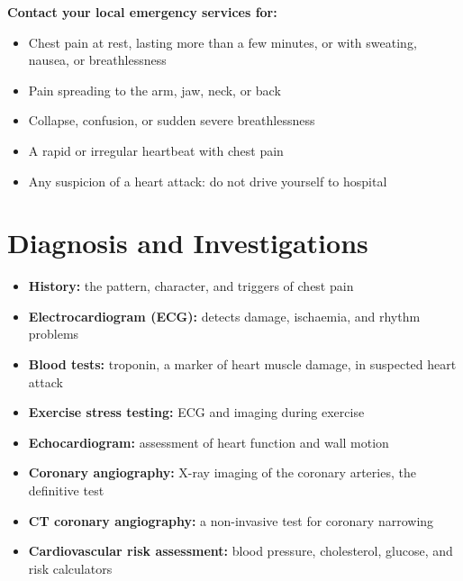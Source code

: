 \textbf{Contact your local emergency services for:}
\begin{itemize}
    \item Chest pain at rest, lasting more than a few minutes, or with sweating, nausea, or breathlessness
    \item Pain spreading to the arm, jaw, neck, or back
    \item Collapse, confusion, or sudden severe breathlessness
    \item A rapid or irregular heartbeat with chest pain
    \item Any suspicion of a heart attack: do not drive yourself to hospital
\end{itemize}

\section*{Diagnosis and Investigations}
\begin{itemize}
    \item \textbf{History:} the pattern, character, and triggers of chest pain
    \item \textbf{Electrocardiogram (ECG):} detects damage, ischaemia, and rhythm problems
    \item \textbf{Blood tests:} troponin, a marker of heart muscle damage, in suspected heart attack
    \item \textbf{Exercise stress testing:} ECG and imaging during exercise
    \item \textbf{Echocardiogram:} assessment of heart function and wall motion
    \item \textbf{Coronary angiography:} X-ray imaging of the coronary arteries, the definitive test
    \item \textbf{CT coronary angiography:} a non-invasive test for coronary narrowing
    \item \textbf{Cardiovascular risk assessment:} blood pressure, cholesterol, glucose, and risk calculators
\end{itemize}

